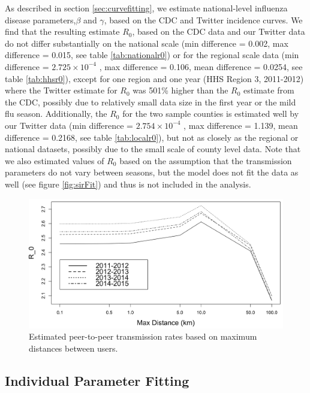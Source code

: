 As described in section \ref{sec:curvefitting}, we estimate national-level influenza disease parameters,\(\beta\) and \(\gamma\),  based on the CDC and Twitter incidence curves. We find that the resulting estimate \(R_0\), based on the CDC data and our Twitter data do not differ substantially on the national scale (min difference = 0.002, max difference = 0.015, see table \ref{tab:nationalr0}) or for the regional scale data (min difference = \(2.725\times 10^{-4}\) , max difference = 0.106, mean difference = 0.0254, see table \ref{tab:hhsr0}), except for one region and one year (HHS Region 3, 2011-2012) where the Twitter estimate for \(R_0\) was 501\% higher than the \(R_0\) estimate from the CDC, possibly due to relatively small data size in the first year or the mild flu season. Additionally, the \(R_0\) for the two sample counties is estimated well by our Twitter data (min difference = \(2.754 \times 10^{-4}\)
, max difference = 1.139, mean difference = 0.2168, see table \ref{tab:localr0}), but not as closely as the regional or national datasets, possibly due to the small scale of county level data. Note that we also  estimated values of \(R_0\) based on the assumption that the transmission parameters do not vary between seasons, but the model does not fit the data as well (see figure \ref{fig:sirFit}) and thus is not included in the analysis.



\begin{figure}
\centering
\includegraphics[width=1.0\textwidth]{longitude/figs/r0_by_distance_time_new.png}
\caption{Estimated peer-to-peer transmission rates based on maximum distances between users.}
\label{fig:r0distance}
\end{figure}

\subsection{Individual Parameter Fitting}




